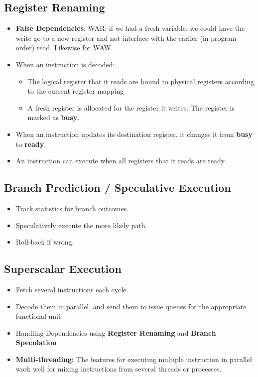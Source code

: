 \documentclass[../main.tex]{subfiles}
\begin{document}
\subsection{Register Renaming}

\begin{itemize}
	\item \textbf{False Dependencies}: WAR: if we had a fresh variable, we could have the write go to a new register and not interface with the earlier (in program order) read. Likewise for WAW.
	\item When an instruction is decoded:
	      \begin{itemize}
		      \item The logical register that it reads are bound to physical registers according to the current register mapping
		      \item A fresh register is allocated for the register it writes. The register is marked as \textbf{busy}.
	      \end{itemize}
	\item When an instruction updates its destination register, it changes it from \textbf{busy} to \textbf{ready}.
	\item An instruction can execute when all registers that it reads are ready.
\end{itemize}

\subsection{Branch Prediction / Speculative Execution}

\begin{itemize}
	\item Track statistics for branch outcomes.
	\item Speculatively execute the more likely path.
	\item Roll-back if wrong.
\end{itemize}

\subsection{Superscalar Execution}

\begin{itemize}
	\item Fetch several instructions each cycle.
	\item Decode them in parallel, and send them to issue queues for the appropriate functional unit.
	\item Handling Dependencies using \textbf{Register Renaming} and \textbf{Branch Speculation}
	\item \textbf{Multi-threading:} The features for executing multiple instruction in parallel work well for mixing instructions from several threads or processes.
\end{itemize}
\end{document}

